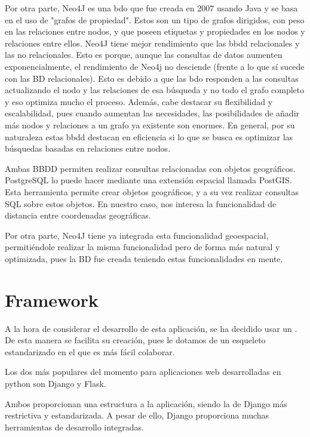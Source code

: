     Por otra parte, Neo4J es una \ac{bdo} que fue creada en 2007 usando Java y se basa en el uso de "grafos de propiedad". Estos son un tipo de grafos dirigidos, con peso en las relaciones entre nodos, y que poseen etiquetas y propiedades en los nodos y relaciones entre ellos. Neo4J tiene mejor rendimiento que las \ac{bbdd} relacionales y las no relacionales. Esto es porque, aunque las consultas de datos aumenten exponencialmente, el rendimiento de Neo4j no desciende (frente a lo que sí sucede con las BD relacionales). Esto es debido a que las \ac{bdo} responden a las consultas actualizando el nodo y las relaciones de esa búsqueda y no todo el grafo completo y eso optimiza mucho el proceso.
    Además, cabe destacar su flexibilidad y escalabilidad, pues cuando aumentan las necesidades, las posibilidades de añadir más nodos y relaciones a un grafo ya existente son enormes.
    En general, por su naturaleza estas \ac{bbdd} destacan en eficiencia si lo que se busca es optimizar las búsquedas basadas en relaciones entre nodos. 
    
    Ambas BBDD permiten realizar consultas relacionadas con objetos geográficos.    
    PostgreSQL lo puede hacer mediante una extensión espacial llamada PostGIS\cite{postgis}. Esta herramienta permite crear objetos geográficos, y a su vez realizar consultas SQL sobre estos objetos. En nuestro caso, nos interesa la funcionalidad de distancia entre coordenadas geográficas.
    
    Por otra parte, Neo4J tiene ya integrada esta funcionalidad geoespacial, permitiéndole realizar la misma funcionalidad pero de forma más natural y optimizada, pues la BD fue creada teniendo estas funcionalidades en mente.
    
  \section{Framework}
    A la hora de considerar el desarrollo de esta aplicación, se ha decidido usar un . De esta manera se facilita su creación, pues le dotamos de un esqueleto estandarizado en el que es más fácil colaborar.
    
    Los dos  más populares del momento para aplicaciones web desarrolladas en python son Django\cite{django} y Flask\cite{flask}.
    
    Ambos proporcionan una estructura a la aplicación, siendo la de Django más restrictiva y estandarizada. A pesar de ello, Django proporciona muchas herramientas de desarrollo integradas.
    
